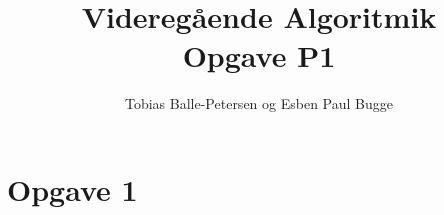 \documentclass[10pt,a4paper,final]{report}
\author{Tobias Balle-Petersen og Esben Paul Bugge}
\title{Videregående Algoritmik\\Opgave P1}
\begin{document}
\maketitle
\section*{Opgave 1}
\end{document}
